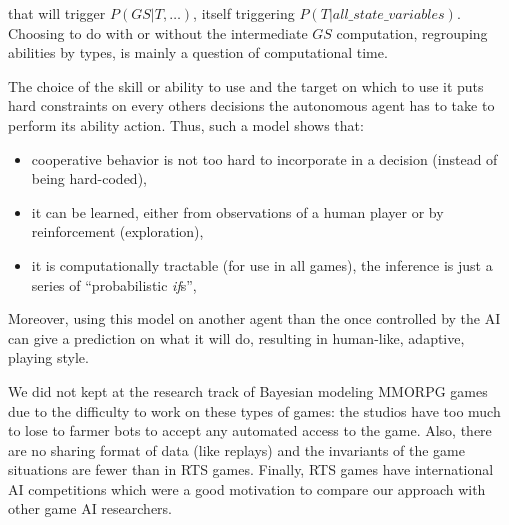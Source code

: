 that will trigger $P(GS|T,\dots)$, itself triggering $P(T|all\_state\_variables)$. Choosing to do with or without the intermediate $GS$ computation, regrouping abilities by types, is mainly a question of computational time.

The choice of the skill or ability to use and the target on which to use it puts hard constraints on every others decisions the autonomous agent has to take to perform its ability action. Thus, such a model shows that:
\begin{itemize}
    \item cooperative behavior is not too hard to incorporate in a decision (instead of being hard-coded),
    \item it can be learned, either from observations of a human player or by reinforcement (exploration),
    \item it is computationally tractable (for use in all games), the inference is just a series of ``probabilistic \textit{if}s'',
\end{itemize}
Moreover, using this model on another agent than the once controlled by the AI can give a prediction on what it will do, resulting in human-like, adaptive, playing style.

We did not kept at the research track of Bayesian modeling MMORPG games due to the difficulty to work on these types of games: the studios have too much to lose to farmer bots to accept any automated access to the game. Also, there are no sharing format of data (like replays) and the invariants of the game situations are fewer than in RTS games. Finally, RTS games have international AI competitions which were a good motivation to compare our approach with other game AI researchers.
